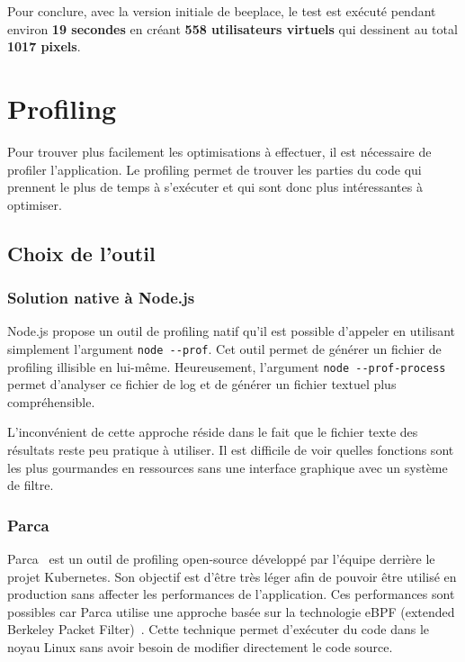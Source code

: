 Pour conclure, avec la version initiale de \gls{beeplace}, le test est exécuté pendant environ \textbf{19 secondes} en créant \textbf{558 utilisateurs virtuels} qui dessinent au total \textbf{1017 pixels}.

\section{Profiling}

Pour trouver plus facilement les optimisations à effectuer, il est nécessaire de profiler l'application. Le profiling permet de trouver les parties du code qui prennent le plus de temps à s'exécuter et qui sont donc plus intéressantes à optimiser.

\subsection{Choix de l'outil}

\subsubsection{Solution native à Node.js}

Node.js propose un outil de profiling natif qu'il est possible d'appeler en utilisant simplement l'argument \texttt{node -{}-prof}. Cet outil permet de générer un fichier de profiling illisible en lui-même. Heureusement, l'argument \texttt{node -{}-prof-process} permet d'analyser ce fichier de log et de générer un fichier textuel plus compréhensible.

L'inconvénient de cette approche réside dans le fait que le fichier texte des résultats reste peu pratique à utiliser. Il est difficile de voir quelles fonctions sont les plus gourmandes en ressources sans une interface graphique avec un système de filtre.

\subsubsection{Parca}

Parca~\cite{parca} est un outil de profiling open-source développé par l'équipe derrière le projet Kubernetes. Son objectif est d'être très léger afin de pouvoir être utilisé en production sans affecter les performances de l'application. Ces performances sont possibles car Parca utilise une approche basée sur la technologie eBPF (extended Berkeley Packet Filter)~\cite{ebpf}. Cette technique permet d'exécuter du code dans le noyau Linux sans avoir besoin de modifier directement le code source.

